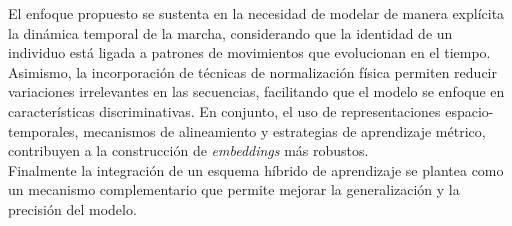 El enfoque propuesto se sustenta en la necesidad de modelar de manera explícita la dinámica temporal de la marcha, considerando que la identidad de un individuo está ligada a patrones de movimientos que evolucionan en el tiempo. \\
Asimismo, la incorporación de técnicas de normalización física permiten reducir variaciones irrelevantes en las secuencias, facilitando que el modelo se enfoque en características discriminativas. En conjunto, el uso de representaciones espacio-temporales, mecanismos de alineamiento y estrategias de aprendizaje métrico, contribuyen a la construcción de \textit{embeddings} más robustos. \\
Finalmente la integración de un esquema híbrido de aprendizaje se plantea como un mecanismo complementario que permite mejorar la generalización y la precisión del modelo.